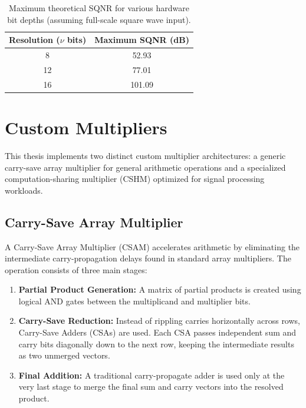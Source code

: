 \begin{table}[htbp]
    \centering
    \caption{Maximum theoretical SQNR for various hardware bit depths (assuming full-scale square wave input).}
    \vspace{0.5em}
    \begin{tabular}{|c|c|}
        \hline
        \textbf{Resolution ($\nu$ bits)} & \textbf{Maximum SQNR (dB)} \\
        \hline
        8 & 52.93 \\
        12 & 77.01 \\
        16 & 101.09 \\
        \hline
    \end{tabular}
    \label{tab:max_sqnr}
\end{table}

\section{Custom Multipliers}
This thesis implements two distinct custom multiplier architectures: a generic carry-save array multiplier for general arithmetic operations and a specialized computation-sharing multiplier (CSHM) optimized for signal processing workloads.

\subsection{Carry-Save Array Multiplier}

A Carry-Save Array Multiplier (CSAM) accelerates arithmetic by eliminating the intermediate carry-propagation delays found in standard array multipliers. The operation consists of three main stages:

\begin{enumerate}
    \item \textbf{Partial Product Generation:} A matrix of partial products is created using logical AND gates between the multiplicand and multiplier bits.
    \item \textbf{Carry-Save Reduction:} Instead of rippling carries horizontally across rows, Carry-Save Adders (CSAs) are used. Each CSA passes independent sum and carry bits diagonally down to the next row, keeping the intermediate results as two unmerged vectors.
    \item \textbf{Final Addition:} A traditional carry-propagate adder is used only at the very last stage to merge the final sum and carry vectors into the resolved product.
\end{enumerate}

